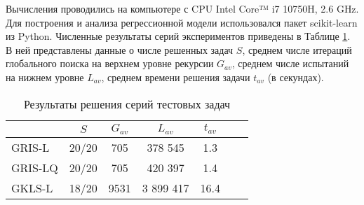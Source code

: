\documentclass[11pt, oneside, a4paper]{article}
\begin{document}
Вычисления проводились на компьютере с CPU Intel Core™ i7 10750H, 2.6 GHz. Для построения и анализа регрессионной модели использовался пакет scikit-learn из Python.
Численные результаты серий экспериментов приведены в Таблице \ref{tab1}.
В ней представлены данные о числе решенных задач $S$, среднем числе итераций глобального поиска на верхнем уровне рекурсии $G_{av}$, среднем числе испытаний на нижнем уровне $L_{av}$, среднем времени решения задачи $t_{av}$ (в секундах).

\begin{table}[ht]
	\caption{Результаты решения серий тестовых задач}
	\label{tab1}
	\begin{center}
		\begin{tabular}{ l c c c c c c } \hline
		 & $S$ &  $G_{av}$ &  $L_{av}$ & $t_{av}$ \\
    \hline
		GRIS-L & 20/20  & 705 &  378 545 & 1.3 \\
		GRIS-LQ & 20/20 & 705 &  420 397 & 1.4 \\
		GKLS-L & 18/20 & 9531 &  3 899 417 & 16.4 \\
		\hline
		\end{tabular}
	\end{center}
\end{table}
\end{document}
